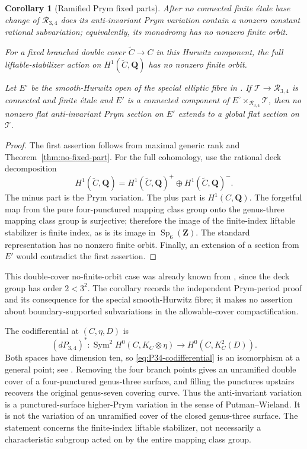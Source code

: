 \documentclass[11pt,reqno]{amsart}
\numberwithin{equation}{section}
\newtheorem{corollary}[theorem]{Corollary}
\theoremstyle{definition}
\theoremstyle{remark}
\newcommand{\Q}{\mathbf Q}
\newcommand{\Z}{\mathbf Z}
\newcommand{\cR}{\mathcal R}
\newcommand{\Sym}{\operatorname{Sym}}
\newcommand{\Sp}{\operatorname{Sp}}
\begin{document}
\begin{corollary}[Ramified Prym fixed parts]\label{cor:P34}
After no connected finite \'etale base change of $\cR_{3,4}$ does its anti-invariant Prym variation contain a nonzero constant rational subvariation; equivalently, its monodromy has no nonzero finite orbit.

For a fixed branched double cover $\widetilde C\to C$ in this Hurwitz component, the full liftable-stabilizer action on $H^1(\widetilde C,\Q)$ has no nonzero finite orbit.

Let $E^\circ$ be the smooth-Hurwitz open of the special elliptic fibre in \cite[Theorem~5.1]{CasalainaMartinZhang2021}.  If $\mathscr T\to\cR_{3,4}$ is connected and finite \'etale and $E'$ is a connected component of $E^\circ\times_{\cR_{3,4}}\mathscr T$, then no nonzero flat anti-invariant Prym section on $E'$ extends to a global flat section on $\mathscr T$.
\end{corollary}

\begin{proof}
The first assertion follows from maximal generic rank and Theorem~\ref{thm:no-fixed-part}.  For the full cohomology, use the rational deck decomposition
\[
H^1(\widetilde C,\Q)=H^1(\widetilde C,\Q)^+
\oplus H^1(\widetilde C,\Q)^-.
\]
The minus part is the Prym variation.  The plus part is $H^1(C,\Q)$.  The forgetful map from the pure four-punctured mapping class group onto the genus-three mapping class group is surjective; therefore the image of the finite-index liftable stabilizer is finite index, as is its image in $\Sp_6(\Z)$.  The standard representation has no nonzero finite orbit.  Finally, an extension of a section from $E'$ would contradict the first assertion.
\end{proof}

This double-cover no-finite-orbit case was already known from \cite[Theorem~1.2]{LandesmanLitt2023}, since the deck group has order $2<3^2$.  The corollary records the independent Prym-period proof and its consequence for the special smooth-Hurwitz fibre; it makes no assertion about boundary-supported subvariations in the allowable-cover compactification.

The codifferential at $(C,\eta,D)$ is
\begin{equation}\label{eq:P34-codifferential}
(dP_{3,4})^*:
\Sym^2H^0(C,K_C\otimes\eta)
\longrightarrow H^0(C,K_C^2(D)).
\end{equation}
Both spaces have dimension ten, so \eqref{eq:P34-codifferential} is an isomorphism at a general point; see \cite[Section~5.4]{CasalainaMartinZhang2021}.  Removing the four branch points gives an unramified double cover of a four-punctured genus-three surface, and filling the punctures upstairs recovers the original genus-seven covering curve.  Thus the anti-invariant variation is a punctured-surface higher-Prym variation in the sense of Putman--Wieland.  It is not the variation of an unramified cover of the closed genus-three surface.  The statement concerns the finite-index liftable stabilizer, not necessarily a characteristic subgroup acted on by the entire mapping class group.
\end{document}
